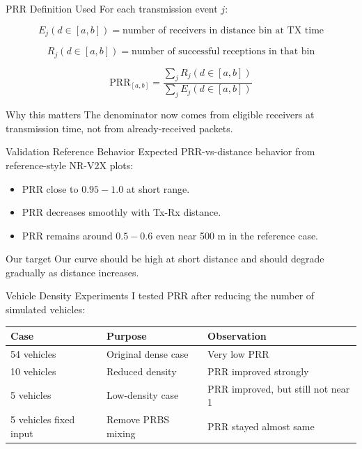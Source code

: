 \documentclass[aspectratio=169,11pt]{beamer}
\begin{document}
\begin{frame}{PRR Definition Used}
\large
For each transmission event \(j\):

\[
E_j(d \in [a,b]) =
\text{number of receivers in distance bin at TX time}
\]

\[
R_j(d \in [a,b]) =
\text{number of successful receptions in that bin}
\]

\[
\mathrm{PRR}_{[a,b]} =
\frac{\sum_j R_j(d \in [a,b])}
     {\sum_j E_j(d \in [a,b])}
\]

\vspace{0.2cm}
\begin{block}{Why this matters}
The denominator now comes from eligible receivers at transmission time, not from already-received packets.
\end{block}
\end{frame}

\begin{frame}{Validation Reference Behavior}
\large
Expected PRR-vs-distance behavior from reference-style NR-V2X plots:

\vspace{0.25cm}
\begin{itemize}
  \item PRR close to \(0.95-1.0\) at short range.
  \item PRR decreases smoothly with Tx-Rx distance.
  \item PRR remains around \(0.5-0.6\) even near 500 m in the reference case.
\end{itemize}

\vspace{0.3cm}
\begin{block}{Our target}
Our curve should be high at short distance and should degrade gradually as distance increases.
\end{block}
\end{frame}

\begin{frame}{Vehicle Density Experiments}
\large
I tested PRR after reducing the number of simulated vehicles:

\vspace{0.25cm}
\begin{table}
\centering
\renewcommand{\arraystretch}{1.25}
\begin{tabular}{>{\raggedright}p{3.2cm} >{\raggedright}p{3.6cm} >{\raggedright\arraybackslash}p{4.2cm}}
\toprule
\textbf{Case} & \textbf{Purpose} & \textbf{Observation} \\
\midrule
54 vehicles & Original dense case & Very low PRR \\
10 vehicles & Reduced density & PRR improved strongly \\
5 vehicles & Low-density case & PRR improved, but still not near 1 \\
5 vehicles fixed input & Remove PRBS mixing & PRR stayed almost same \\
\bottomrule
\end{tabular}
\end{table}
\end{frame}
\end{document}
